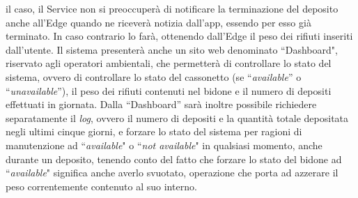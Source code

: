 \documentclass[a4paper, 12pt]{report}
\begin{document}
	il caso, il Service non si preoccuperà di notificare la terminazione del deposito anche all'Edge 
	quando ne riceverà notizia dall'app,
	essendo per esso già terminato. In caso contrario lo farà, ottenendo dall'Edge il peso dei rifiuti
	inseriti dall'utente.\newline
	Il sistema presenterà anche un sito web denominato ``Dashboard", riservato agli operatori
	ambientali, che permetterà di controllare lo stato del sistema, ovvero di controllare lo stato del
	cassonetto (se ``\textit{available}'' o ``\textit{unavailable}''), il peso dei rifiuti contenuti nel bidone e il 
	numero di depositi effettuati in giornata. Dalla ``Dashboard'' sarà inoltre possibile richiedere separatamente il \textit{log},
	ovvero il numero di depositi e la quantità totale depositata negli ultimi cinque giorni, e
	forzare lo stato del sistema per ragioni di manutenzione ad ``\textit{available}" o
	``\textit{not available}" in qualsiasi momento, anche durante un deposito, tenendo conto del fatto
	che forzare lo stato del bidone ad ``\textit{available}" significa anche averlo svuotato, operazione che 
	porta ad azzerare il peso correntemente contenuto al suo interno.
\end{document}
